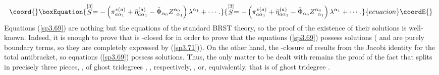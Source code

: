 \documentclass[a4paper,12pt]{article}
\begin{document}
\begin{equation}\coord{}\boxEquation{
\stackrel{\lbrack 3]}{S}=-\left( \pi _{a\alpha _{1}}^{*(a)}+\bar{\eta}
_{a\alpha _{1}}^{(a)}-\tilde{\Phi}_{\alpha _{0}}Z_{\;\;\alpha _{1}}^{\alpha
_{0}}\right) \lambda ^{\alpha _{1}}+\cdots .  \label{sp3.73}
}{
\stackrel{\lbrack 3]}{S}=-\left( \pi _{a\alpha _{1}}^{*(a)}+\bar{\eta}
_{a\alpha _{1}}^{(a)}-\tilde{\Phi}_{\alpha _{0}}Z_{\;\;\alpha _{1}}^{\alpha
_{0}}\right) \lambda ^{\alpha _{1}}+\cdots .  }{ecuacion}\coordE{}\end{equation}
Equations (\ref{sp3.69}) are nothing but the equations of the standard BRST
theory, so the proof of the existence of their solutions is well-known.
Indeed, it is enough to prove that \coordHE{} is \myHighlight{$\delta $}\coordHE{}-closed
for \coordHE{} in order to prove that the equations (\ref{sp3.69}) possess
solutions (\coordHE{} and \coordHE{} are purely boundary
terms, so they are completely expressed by (\ref{sp3.71})). On the other
hand, the \myHighlight{$\delta $}\coordHE{}-closure of \coordHE{} results from the Jacobi
identity for the total antibracket, so equations (\ref{sp3.69}) possess
solutions. Thus, the only matter to be dealt with remains the proof of the
fact that \coordHE{} splits in precisely three pieces, \coordHE{}, of
ghost tridegrees \coordHE{}, \coordHE{},
respectively, \coordHE{}, or, equivalently, that \coordHE{} is of ghost
tridegree \coordHE{}.
\end{document}
